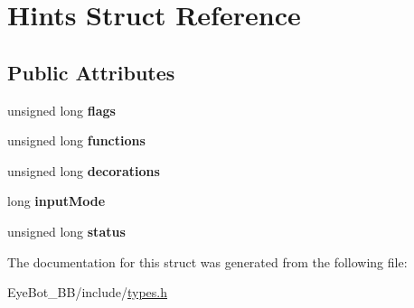 \hypertarget{struct_hints}{\section{\-Hints \-Struct \-Reference}
\label{struct_hints}
}
\subsection*{\-Public \-Attributes}
\begin{DoxyCompactItemize}
\item 
\hypertarget{struct_hints_adedbbdfcb10b5ab610600bc04c00792a}{unsigned long {\bfseries flags}}\label{struct_hints_adedbbdfcb10b5ab610600bc04c00792a}

\item 
\hypertarget{struct_hints_a0c659dfd3ec95e4479f308ac52f4ddb4}{unsigned long {\bfseries functions}}\label{struct_hints_a0c659dfd3ec95e4479f308ac52f4ddb4}

\item 
\hypertarget{struct_hints_a093249586b8e89a96593e2c066f2edb9}{unsigned long {\bfseries decorations}}\label{struct_hints_a093249586b8e89a96593e2c066f2edb9}

\item 
\hypertarget{struct_hints_ad7232b2d9e13cefd572f0c9a0442a616}{long {\bfseries input\-Mode}}\label{struct_hints_ad7232b2d9e13cefd572f0c9a0442a616}

\item 
\hypertarget{struct_hints_af2ef49f0e5839fbf5c7851f62697ccda}{unsigned long {\bfseries status}}\label{struct_hints_af2ef49f0e5839fbf5c7851f62697ccda}

\end{DoxyCompactItemize}


\-The documentation for this struct was generated from the following file\-:\begin{DoxyCompactItemize}
\item 
\-Eye\-Bot\-\_\-\-B\-B/include/\hyperlink{types_8h}{types.\-h}\end{DoxyCompactItemize}
